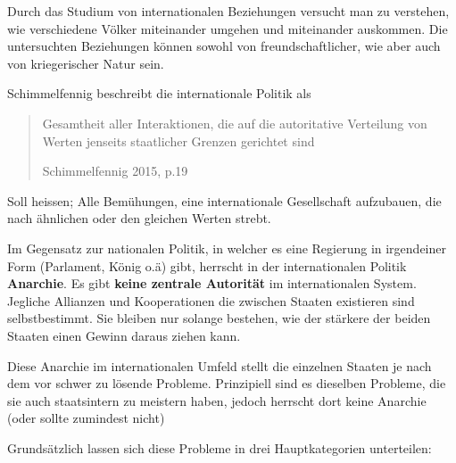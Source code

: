 \documentclass[a4paper, 11pt]{article}
\begin{document}
Durch das Studium von internationalen Beziehungen versucht man zu verstehen, wie verschiedene Völker miteinander umgehen und miteinander auskommen. Die untersuchten Beziehungen können sowohl von freundschaftlicher, wie aber auch von kriegerischer Natur sein.

\vspace{10px}

Schimmelfennig beschreibt die internationale Politik als \blockquote[Schimmelfennig 2015, p.19]{Gesamtheit aller Interaktionen, die auf die autoritative Verteilung von Werten jenseits staatlicher Grenzen gerichtet sind}. Soll heissen; Alle Bemühungen, eine internationale Gesellschaft aufzubauen, die nach ähnlichen oder den gleichen Werten strebt.

\vspace{10px}

Im Gegensatz zur nationalen Politik, in welcher es eine Regierung in irgendeiner Form (Parlament, König o.ä) gibt, herrscht in der internationalen Politik \textbf{Anarchie}. Es gibt \textbf{keine zentrale Autorität} im internationalen System. Jegliche Allianzen und Kooperationen die zwischen Staaten existieren sind selbstbestimmt. Sie bleiben nur solange bestehen, wie der stärkere der beiden Staaten einen Gewinn daraus ziehen kann.

Diese Anarchie im internationalen Umfeld stellt die einzelnen Staaten je nach dem vor schwer zu lösende Probleme. Prinzipiell sind es dieselben Probleme, die sie auch staatsintern zu meistern haben, jedoch herrscht dort keine Anarchie (oder sollte zumindest nicht)

Grundsätzlich lassen sich diese Probleme in drei Hauptkategorien unterteilen:
\end{document}

